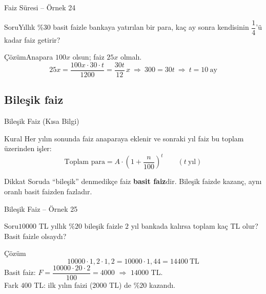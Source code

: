 \documentclass[aspectratio=169,11pt,handout]{beamer}
\newcommand{\soru}[3]{%
\begin{frame}{#1}
  \begin{block}{Soru}\large #2\end{block}
  \pause
  \begin{exampleblock}{Çözüm}\large #3\end{exampleblock}
\end{frame}}
\begin{document}
\soru{Faiz Süresi -- Örnek 24}
{Yıllık \(\%30\) basit faizle bankaya yatırılan bir para, kaç ay sonra kendisinin \(\dfrac{1}{4}\)'ü kadar faiz getirir?}
{Anapara \(100x\) olsun; faiz \(25x\) olmalı.
\[25x=\frac{100x\cdot 30\cdot t}{1200}=\frac{30t}{12}\,x\ \Rightarrow\ 300=30t\ \Rightarrow\ t=10\ \text{ay}\]}

\subsection{Bileşik faiz}
\begin{frame}{Bileşik Faiz (Kısa Bilgi)}
\begin{block}{Kural}
Her yılın sonunda faiz anaparaya eklenir ve sonraki yıl faiz bu toplam üzerinden işler:
\[\text{Toplam para}=A\cdot\left(1+\frac{n}{100}\right)^t\qquad(t\ \text{yıl})\]
\end{block}
\begin{alertblock}{Dikkat}
Soruda ``bileşik'' denmedikçe faiz \textbf{basit faiz}dir. Bileşik faizde kazanç, aynı oranlı basit faizden fazladır.
\end{alertblock}
\end{frame}

\soru{Bileşik Faiz -- Örnek 25}
{\(10000\) TL yıllık \(\%20\) bileşik faizle \(2\) yıl bankada kalırsa toplam kaç TL olur? Basit faizle olsaydı?}
{\[10000\cdot 1{,}2\cdot 1{,}2=10000\cdot 1{,}44=14400\ \text{TL}\]
Basit faiz: \(F=\dfrac{10000\cdot 20\cdot 2}{100}=4000\) \(\Rightarrow\) \(14000\) TL.\\[3pt]
Fark \(400\) TL: ilk yılın faizi (\(2000\) TL) de \(\%20\) kazandı.}
\end{document}
